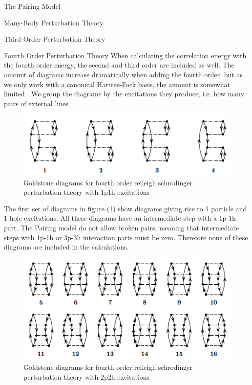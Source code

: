 \documentclass[twoside,english]{uiofysmaster}
\begin{document}
\begin{chapter}{The Pairing Model}
\begin{section}{Many-Body Perturbation Theory}
\begin{subsection}{Third Order Perturbation Theory}
		\end{subsection}

		\begin{subsection}{Fourth Order Perturbation Theory}
			When calculating the correlation energy with the fourth order energy, the second and third order are included as well. The amount of diagrams increase dramatically when adding the fourth order, but as we only work with a canonical Hartree-Fock basis, the amount is somewhat limited \cite{ShavittAndBartlett}. We group the diagrams by the excitations they produce, i.e. how many pairs of external lines. 
			\begin{figure}[H]
				\includegraphics[width=\textwidth]{Figures/fourthorder1p1h.png}
				\caption{Goldstone diagrams for fourth order reileigh schrodinger perturbation theory with 1p1h excitations}
				\label{figure:mbpt1p1h}
			\end{figure}
			The first set of diagrams in figure (\ref{figure:mbpt1p1h}) show diagrams giving rise to 1 particle and 1 hole excitations. All these diagrams have an intermediate step with a 1p-1h part. The Pairing model do not allow broken pairs, meaning that intermediate steps with 1p-1h or 3p-3h interaction parts must be zero. Therefore none of these diagrams are included in the calculations.
			\begin{figure}[H]
				\includegraphics[width=\textwidth]{Figures/fourthorder2p2h.png}
				\caption{Goldstone diagrams for fourth order reileigh schrodinger perturbation theory with 2p2h excitations}

\end{figure}
\end{subsection}
\end{section}
\end{chapter}
\end{document}
